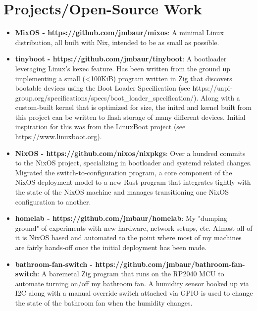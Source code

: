\documentclass[a4paper,20pt]{article}
\newcommand{\resumeItem}[2]{
\item\small{\textbf{#1}{: #2 \vspace{-2pt}}}}
\newcommand{\resumeSubItem}[2]{\resumeItem{#1}{#2}\vspace{-3pt}}
\newcommand{\resumeSubHeadingListStart}{
\begin{itemize}[leftmargin=*]}
\newcommand{\resumeSubHeadingListEnd}{
\end{itemize}}
\begin{document}
\section{Projects/Open-Source Work}
\resumeSubHeadingListStart
\resumeSubItem{\hypertarget{mixos}{MixOS} - https://github.com/jmbaur/mixos}
{A minimal Linux distribution, all built with Nix, intended to be as
small as possible.}
\vspace{2pt}
\resumeSubItem{tinyboot - https://github.com/jmbaur/tinyboot}
{A bootloader leveraging Linux's kexec feature. Has been written from the
  ground up implementing a small (<100KiB) program written in Zig that discovers
  bootable devices using the Boot Loader Specification (see
  https://uapi-group.org/specifications/specs/boot\_loader\_specification/).
  Along with a custom-built kernel that is optimized for size, the initrd and
  kernel built from this project can be written to flash storage of many
  different devices. Initial inspiration for this was from the LinuxBoot project
(see https://www.linuxboot.org).}
\vspace{2pt}
\resumeSubItem{NixOS - https://github.com/nixos/nixpkgs}
{Over a hundred commits to the NixOS project, specializing in bootloader and
  systemd related changes. Migrated the switch-to-configuration program, a core
  component of the NixOS deployment model to a new Rust program that integrates
  tightly with the state of the NixOS machine and manages
  transitioning one NixOS
configuration to another.}
\vspace{2pt}
\resumeSubItem{homelab - https://github.com/jmbaur/homelab}
{My "dumping ground" of experiments with new hardware, network setups, etc.
  Almost all of it is NixOS based and automated to the point where most of my
machines are fairly hands-off once the initial deployment has been made.}
\vspace{2pt}
\resumeSubItem{bathroom-fan-switch -
https://github.com/jmbaur/bathroom-fan-switch}
{A baremetal Zig program that runs on the RP2040 MCU to automate turning on/off
  my bathroom fan. A humidity sensor hooked up via I2C along with a manual
  override switch attached via GPIO is used to change the state of the bathroom
fan when the humidity changes.}
\resumeSubHeadingListEnd
\end{document}
